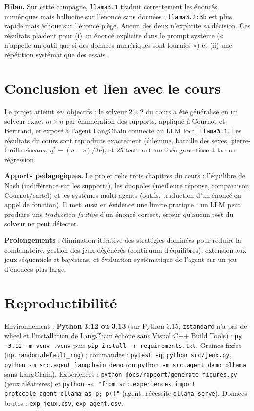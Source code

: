 \documentclass[11pt,a4paper]{article}
\begin{document}
\noindent\textbf{Bilan.} Sur cette campagne, \texttt{llama3.1} traduit correctement les
énoncés numériques mais hallucine sur l'énoncé sans données ; \texttt{llama3.2:3b} est plus
rapide mais échoue sur l'énoncé piège. Aucun des deux n'explicite sa décision. Ces résultats
plaident pour (i) un énoncé explicite dans le prompt système (« n'appelle un outil que si
des données numériques sont fournies ») et (ii) une répétition systématique des essais.

\section{Conclusion et lien avec le cours}
Le projet atteint ses objectifs : le solveur $2\times2$ du cours a été généralisé en un
solveur exact $m\times n$ par énumération des supports, appliqué à Cournot et Bertrand, et
exposé à l'agent LangChain connecté au LLM local \texttt{llama3.1}. Les résultats du cours
sont reproduits exactement (dilemme, bataille des sexes, pierre-feuille-ciseaux,
$q^{*}=(a-c)/3b$), et 25 tests automatisés garantissent la non-régression.

\textbf{Apports pédagogiques.} Le projet relie trois chapitres du cours : l'équilibre de
Nash (indifférence sur les supports), les duopoles (meilleure réponse, comparaison
Cournot/cartel) et les systèmes multi-agents (outils, traduction d'un énoncé en appel de
fonction). Il met aussi en évidence une limite pratique : un LLM peut produire une
\emph{traduction fautive} d'un énoncé correct, erreur qu'aucun test du solveur ne peut
détecter.

\textbf{Prolongements} : élimination itérative des stratégies dominées pour réduire la
combinatoire, gestion des jeux dégénérés (continuum d'équilibres), extension aux jeux
séquentiels et bayésiens, et évaluation systématique de l'agent sur un jeu d'énoncés plus
large.

\appendix
\section{Reproductibilité}
Environnement : \textbf{Python 3.12 ou 3.13} (sur Python 3.15, \texttt{zstandard} n'a pas de
wheel et l'installation de LangChain échoue sans Visual C++ Build Tools) ;
\texttt{py -3.12 -m venv .venv} puis \texttt{pip install -r requirements.txt}.
Graines fixées (\texttt{np.random.default\_rng}) ; commandes : \texttt{pytest -q},
\texttt{python src/jeux.py}, \texttt{python -m src.agent\_langchain\_demo}
(ou \texttt{python -m src.agent\_demo\_ollama} sans LangChain).
Expériences : \texttt{python docs/rapport/generate\_figures.py} (jeux aléatoires) et
\texttt{python -c "from src.experiences import protocole\_agent\_ollama as p; p()"}
(agent, nécessite \texttt{ollama serve}). Données brutes : \texttt{exp\_jeux.csv},
\texttt{exp\_agent.csv}.
\end{document}
